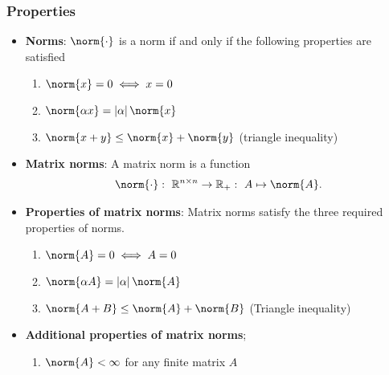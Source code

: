 \documentclass{report}
\begin{document}
    \subsubsection{Properties}
    \begin{itemize}
        \item \textbf{Norms}: 
            $\norm{\cdot}$ is a norm if and only if the following properties are satisfied
            \begin{enumerate}
                \item $\norm{x} = 0 \iff x= 0 $ 
                \item $ \norm{\alpha x} = \left\lvert \alpha \right\rvert \norm{x}$
                \item $\norm{x+y} \leq \norm{x} + \norm{y} $ (triangle inequality)
            \end{enumerate}
        \item \textbf{Matrix norms}: A matrix norm is a function 
            \begin{align*}
                \norm{\cdot }:\ \mathbb{R}^{n\times n} \to \mathbb{R}_{+}:\ A \mapsto  \norm{A}
            .\end{align*}
        \item \textbf{Properties of matrix norms}: Matrix norms satisfy the three required properties of norms.
            \begin{enumerate}
                \item $\norm{A} = 0 \iff A = 0 $
                \item $\norm{\alpha A} = \left\lvert \alpha \right\rvert \norm{A} $
                \item $\norm{A + B} \leq \norm{A} + \norm{B} $ (Triangle inequality)
            \end{enumerate}
       
        \item \textbf{Additional properties of matrix norms};
            \begin{enumerate}
                \item $\norm{A} < \infty$ for any finite matrix $A$
            \end{enumerate}


\end{itemize}
\end{document}
